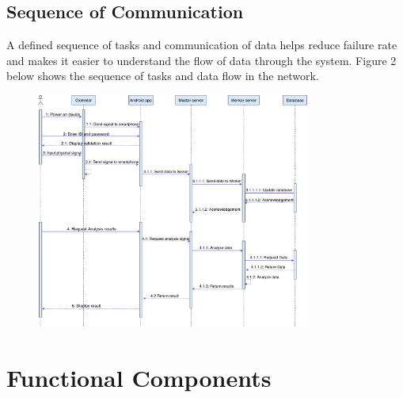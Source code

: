 \documentclass[10pt,journal,compsoc]{IEEEtran}
\begin{document}
\subsection{Sequence of Communication}
A defined sequence of tasks and communication of data helps reduce failure rate and makes it easier to understand the flow of data through the system. Figure 2 below shows the sequence of tasks and data flow in the network.
\begin{figure}[h]
\centering
\includegraphics[width=9cm]{sequence}
\end{figure}

\section{Functional Components}
\end{document}
